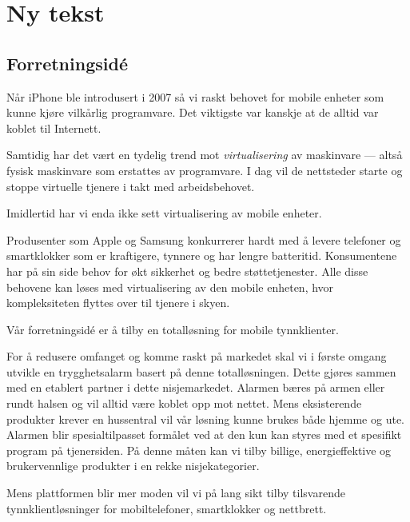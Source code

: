 \chapter{Ny tekst}

\section{Forretningsidé}

Når iPhone ble introdusert i 2007 så vi raskt behovet for mobile enheter som
kunne kjøre vilkårlig programvare. Det viktigste var kanskje at de alltid var
koblet til Internett.

Samtidig har det vært en tydelig trend mot \textit{virtualisering} av
maskinvare --- altså fysisk maskinvare som erstattes av programvare.  I dag vil
de nettsteder starte og stoppe virtuelle tjenere i takt med arbeidsbehovet.

Imidlertid har vi enda ikke sett virtualisering av mobile enheter.

Produsenter som Apple og Samsung konkurrerer hardt med å levere telefoner og
smartklokker som er kraftigere, tynnere og har lengre batteritid.
%
Konsumentene har på sin side behov for økt sikkerhet og bedre støttetjenester.
%
Alle disse behovene kan løses med virtualisering av den mobile enheten, hvor
kompleksiteten flyttes over til tjenere i skyen.

Vår forretningsidé er å tilby en totalløsning for mobile tynnklienter.

For å redusere omfanget og komme raskt på markedet skal vi i første omgang
utvikle en trygghetsalarm basert på denne totalløsningen.
%
Dette gjøres sammen med en etablert partner i dette nisjemarkedet.
%
Alarmen bæres på armen eller rundt halsen og vil alltid være koblet opp mot
nettet.
%
Mens eksisterende produkter krever en hussentral vil vår løsning kunne brukes
både hjemme og ute.
%
Alarmen blir spesialtilpasset formålet ved at den kun kan styres med et
spesifikt program på tjenersiden.
%
På denne måten kan vi tilby billige, energieffektive og brukervennlige
produkter i en rekke nisjekategorier.

Mens plattformen blir mer moden vil vi på lang sikt tilby tilsvarende
tynnklientløsninger for mobiltelefoner, smartklokker og nettbrett.
